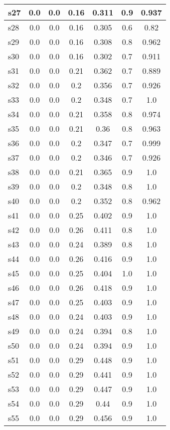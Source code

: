 \documentclass{article}
\begin{document}
\begin{tabular}{|l|c|c|c|c|c|c|}
\hline
s27 &0.0 & 0.0 & 0.16 & 0.311 & 0.9 & 0.937\\
\hline
s28 &0.0 & 0.0 & 0.16 & 0.305 & 0.6 & 0.82\\
\hline
s29 &0.0 & 0.0 & 0.16 & 0.308 & 0.8 & 0.962\\
\hline
s30 &0.0 & 0.0 & 0.16 & 0.302 & 0.7 & 0.911\\
\hline
s31 &0.0 & 0.0 & 0.21 & 0.362 & 0.7 & 0.889\\
\hline
s32 &0.0 & 0.0 & 0.2 & 0.356 & 0.7 & 0.926\\
\hline
s33 &0.0 & 0.0 & 0.2 & 0.348 & 0.7 & 1.0\\
\hline
s34 &0.0 & 0.0 & 0.21 & 0.358 & 0.8 & 0.974\\
\hline
s35 &0.0 & 0.0 & 0.21 & 0.36 & 0.8 & 0.963\\
\hline
s36 &0.0 & 0.0 & 0.2 & 0.347 & 0.7 & 0.999\\
\hline
s37 &0.0 & 0.0 & 0.2 & 0.346 & 0.7 & 0.926\\
\hline
s38 &0.0 & 0.0 & 0.21 & 0.365 & 0.9 & 1.0\\
\hline
s39 &0.0 & 0.0 & 0.2 & 0.348 & 0.8 & 1.0\\
\hline
s40 &0.0 & 0.0 & 0.2 & 0.352 & 0.8 & 0.962\\
\hline
s41 &0.0 & 0.0 & 0.25 & 0.402 & 0.9 & 1.0\\
\hline
s42 &0.0 & 0.0 & 0.26 & 0.411 & 0.8 & 1.0\\
\hline
s43 &0.0 & 0.0 & 0.24 & 0.389 & 0.8 & 1.0\\
\hline
s44 &0.0 & 0.0 & 0.26 & 0.416 & 0.9 & 1.0\\
\hline
s45 &0.0 & 0.0 & 0.25 & 0.404 & 1.0 & 1.0\\
\hline
s46 &0.0 & 0.0 & 0.26 & 0.418 & 0.9 & 1.0\\
\hline
s47 &0.0 & 0.0 & 0.25 & 0.403 & 0.9 & 1.0\\
\hline
s48 &0.0 & 0.0 & 0.24 & 0.403 & 0.9 & 1.0\\
\hline
s49 &0.0 & 0.0 & 0.24 & 0.394 & 0.8 & 1.0\\
\hline
s50 &0.0 & 0.0 & 0.24 & 0.394 & 0.9 & 1.0\\
\hline
s51 &0.0 & 0.0 & 0.29 & 0.448 & 0.9 & 1.0\\
\hline
s52 &0.0 & 0.0 & 0.29 & 0.441 & 0.9 & 1.0\\
\hline
s53 &0.0 & 0.0 & 0.29 & 0.447 & 0.9 & 1.0\\
\hline
s54 &0.0 & 0.0 & 0.29 & 0.44 & 0.9 & 1.0\\
\hline
s55 &0.0 & 0.0 & 0.29 & 0.456 & 0.9 & 1.0\\

\end{tabular}
\end{document}
